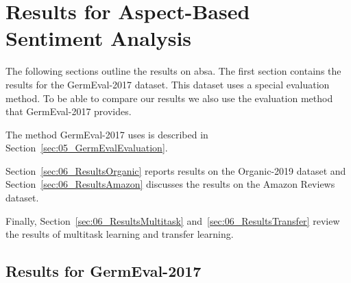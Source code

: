 \section{Results for Aspect-Based Sentiment Analysis}
The following sections outline the results on \acrfull{absa}. The first section contains the results for the GermEval-2017 dataset. This dataset uses a special evaluation method. To be able to compare our results we also use the evaluation method that GermEval-2017 provides.

The method GermEval-2017 uses is described in Section~\ref{sec:05_GermEvalEvaluation}.
\medskip

Section~\ref{sec:06_ResultsOrganic} reports results on the Organic-2019 dataset and Section~\ref{sec:06_ResultsAmazon} discusses the results on the Amazon Reviews dataset.

Finally, Section~\ref{sec:06_ResultsMultitask} and~\ref{sec:06_ResultsTransfer} review the results of multitask learning and transfer learning.

\subsection{Results for GermEval-2017}
\label{sec:06_ResultsGermEval}

